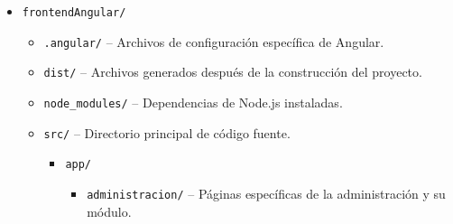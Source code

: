 \begin{itemize}
    \item \texttt{frontendAngular/}
    \begin{itemize}
        \item \texttt{.angular/} -- Archivos de configuración específica de Angular.
        \item \texttt{dist/} -- Archivos generados después de la construcción del proyecto.
        \item \texttt{node\_modules/} -- Dependencias de Node.js instaladas.
        \item \texttt{src/} -- Directorio principal de código fuente.
        \begin{itemize}
            \item \texttt{app/}
            \begin{itemize}
                \item \texttt{administracion/} -- Páginas específicas de la administración y su módulo.
                

\end{itemize}
\end{itemize}
\end{itemize}
\end{itemize}
